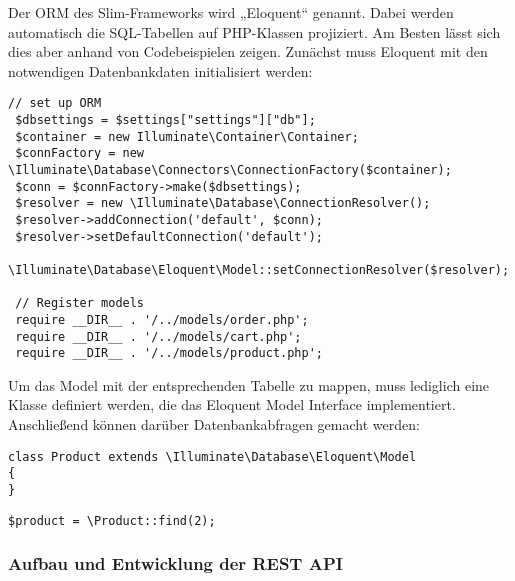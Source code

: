 Der \ac{ORM} des Slim-Frameworks wird „Eloquent“ genannt. Dabei werden automatisch die \ac{SQL}-Tabellen auf \ac{PHP}-Klassen projiziert. Am Besten lässt sich dies aber anhand von Codebeispielen zeigen.
Zunächst muss Eloquent mit den notwendigen Datenbankdaten initialisiert werden:
\lstset{language=PHP}  
\begin{lstlisting}[frame=single, breaklines=true] 
// set up ORM
 $dbsettings = $settings["settings"]["db"];
 $container = new Illuminate\Container\Container;
 $connFactory = new \Illuminate\Database\Connectors\ConnectionFactory($container);
 $conn = $connFactory->make($dbsettings);
 $resolver = new \Illuminate\Database\ConnectionResolver();
 $resolver->addConnection('default', $conn);
 $resolver->setDefaultConnection('default');
 \Illuminate\Database\Eloquent\Model::setConnectionResolver($resolver);
 
 // Register models
 require __DIR__ . '/../models/order.php';
 require __DIR__ . '/../models/cart.php';
 require __DIR__ . '/../models/product.php';
\end{lstlisting}

Um das Model mit der entsprechenden Tabelle zu mappen, muss lediglich eine Klasse definiert werden, die das Eloquent Model Interface implementiert. Anschließend können darüber Datenbankabfragen gemacht werden:
\begin{lstlisting}[frame=single] 
class Product extends \Illuminate\Database\Eloquent\Model
{
}
\end{lstlisting}
\begin{lstlisting}[frame=single] 
 $product = \Product::find(2);
\end{lstlisting}

\subsubsection{Aufbau und Entwicklung der REST API}  
\label{sec:Aufbau und Entwicklung der REST API-1}
